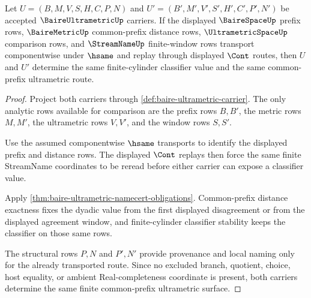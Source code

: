 \begin{theorem}
\label{thm:baire-ultrametric-prefix-stability}
Let $U=(B,M,V,S,H,C,P,N)$ and $U'=(B',M',V',S',H',C',P',N')$ be accepted $\BaireUltrametricUp$ carriers. If the displayed $\BaireSpaceUp$ prefix rows, $\BaireMetricUp$ common-prefix distance rows, $\UltrametricSpaceUp$ comparison rows, and $\StreamNameUp$ finite-window rows transport componentwise under $\hsame$ and replay through displayed $\Cont$ routes, then $U$ and $U'$ determine the same finite-cylinder classifier value and the same common-prefix ultrametric route.
\end{theorem}
\begin{proof}
Project both carriers through \autoref{def:baire-ultrametric-carrier}. The only analytic rows available for comparison are the prefix rows $B,B'$, the metric rows $M,M'$, the ultrametric rows $V,V'$, and the window rows $S,S'$.

Use the assumed componentwise $\hsame$ transports to identify the displayed prefix and distance rows. The displayed $\Cont$ replays then force the same finite StreamName coordinates to be reread before either carrier can expose a classifier value.

Apply \autoref{thm:baire-ultrametric-namecert-obligations}. Common-prefix distance exactness fixes the dyadic value from the first displayed disagreement or from the displayed agreement window, and finite-cylinder classifier stability keeps the classifier on those same rows.

The structural rows $P,N$ and $P',N'$ provide provenance and local naming only for the already transported route. Since no excluded branch, quotient, choice, host equality, or ambient Real-completeness coordinate is present, both carriers determine the same finite common-prefix ultrametric surface.
\end{proof}

